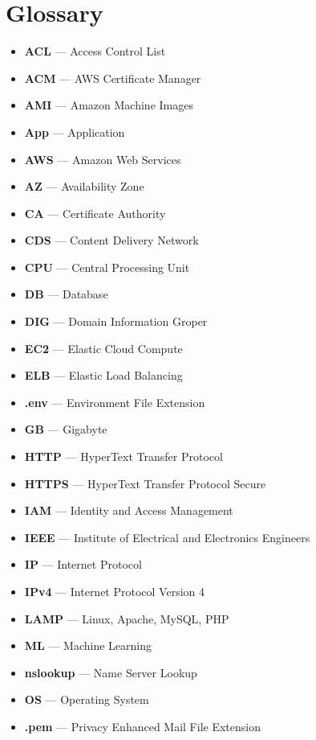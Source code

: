 \chapter{Glossary}\label{ch:glossary}

\begin{itemize}
    \item  \textbf{ACL} — Access Control List
    \item  \textbf{ACM} — AWS Certificate Manager
    \item  \textbf{AMI} — Amazon Machine Images
    \item  \textbf{App} — Application
    \item  \textbf{AWS} — Amazon Web Services
    \item  \textbf{AZ} — Availability Zone
    \item  \textbf{CA} — Certificate Authority
    \item  \textbf{CDS} — Content Delivery Network
    \item  \textbf{CPU} — Central Processing Unit
    \item  \textbf{DB} — Database
    \item  \textbf{DIG} — Domain Information Groper
    \item  \textbf{EC2} — Elastic Cloud Compute
    \item  \textbf{ELB} — Elastic Load Balancing
    \item  \textbf{.env} — Environment File Extension
    \item  \textbf{GB} — Gigabyte
    \item  \textbf{HTTP} — HyperText Transfer Protocol
    \item  \textbf{HTTPS} — HyperText Transfer Protocol Secure
    \item  \textbf{IAM} — Identity and Access Management
    \item  \textbf{IEEE} — Institute of Electrical and Electronics Engineers
    \item  \textbf{IP} — Internet Protocol
    \item  \textbf{IPv4} — Internet Protocol Version 4
    \item  \textbf{LAMP} — Linux, Apache, MySQL, PHP
    \item  \textbf{ML} — Machine Learning
    \item  \textbf{nslookup} — Name Server Lookup
    \item  \textbf{OS} — Operating System
    \item  \textbf{.pem} — Privacy Enhanced Mail File Extension

\end{itemize}
